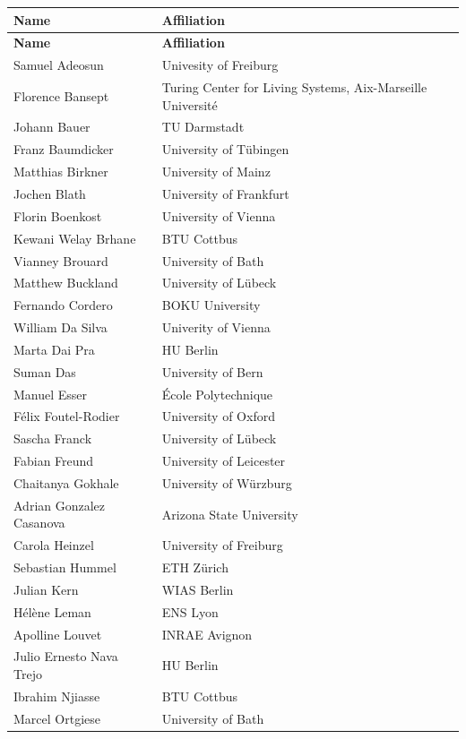 \documentclass[12pt,a4paper]{article}
\begin{document}
\begin{longtable}{L{0.3\textwidth}R{0.7\textwidth}}
\hline
\textbf{Name} & \textbf{Affiliation} \\
\hline
\endfirsthead

\hline
\textbf{Name} & \textbf{Affiliation} \\
\hline
\endhead

Samuel Adeosun & Univesity of Freiburg \\
Florence Bansept & Turing Center for Living Systems, Aix-Marseille Université \\
Johann Bauer & TU Darmstadt \\
Franz Baumdicker & University of Tübingen \\
Matthias Birkner & University of Mainz \\
Jochen Blath & University of Frankfurt \\
Florin Boenkost & University of Vienna \\
Kewani Welay Brhane & BTU Cottbus \\
Vianney Brouard & University of Bath \\
Matthew Buckland & University of Lübeck \\
Fernando Cordero & BOKU University \\
William Da Silva & Univerity of Vienna \\
Marta Dai Pra & HU Berlin \\
Suman Das & University of Bern \\
Manuel Esser & École Polytechnique \\
Félix Foutel-Rodier & University of Oxford \\
Sascha Franck & University of Lübeck \\
Fabian Freund & University of Leicester \\
Chaitanya Gokhale & University of Würzburg \\
Adrian Gonzalez Casanova & Arizona State University \\
Carola Heinzel & University of Freiburg \\
Sebastian Hummel & ETH Zürich \\
Julian Kern & WIAS Berlin \\
Hélène Leman & ENS Lyon \\
Apolline Louvet & INRAE Avignon \\
Julio Ernesto Nava Trejo & HU Berlin \\
Ibrahim Njiasse & BTU Cottbus \\
Marcel Ortgiese & University of Bath \\

\end{longtable}
\end{document}

